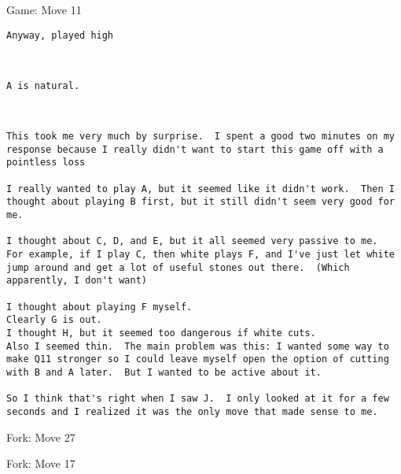 \documentclass{article}
\begin{document}
\begin{section}{Game: Move 11}
\begin{center}
\begin{lstlisting}
Anyway, played high\end{lstlisting}
\end{center}
\begin{center}
\cleargoban
{}
\showfullgoban
\\\begin{lstlisting}
A is natural.\end{lstlisting}
\end{center}
\begin{center}
\cleargoban
{}
\showfullgoban
\\\begin{lstlisting}
This took me very much by surprise.  I spent a good two minutes on my response because I really didn't want to start this game off with a pointless loss

I really wanted to play A, but it seemed like it didn't work.  Then I thought about playing B first, but it still didn't seem very good for me.

I thought about C, D, and E, but it all seemed very passive to me.  For example, if I play C, then white plays F, and I've just let white jump around and get a lot of useful stones out there.  (Which apparently, I don't want)

I thought about playing F myself.
Clearly G is out.
I thought H, but it seemed too dangerous if white cuts.
Also I seemed thin.  The main problem was this: I wanted some way to make Q11 stronger so I could leave myself open the option of cutting with B and A later.  But I wanted to be active about it.

So I think that's right when I saw J.  I only looked at it for a few seconds and I realized it was the only move that made sense to me.\end{lstlisting}
\end{center}
\end{section}
\begin{subsection}{Fork: Move 27}
\end{subsection}
\begin{subsection}{Fork: Move 17}
\end{subsection}
\end{document}
